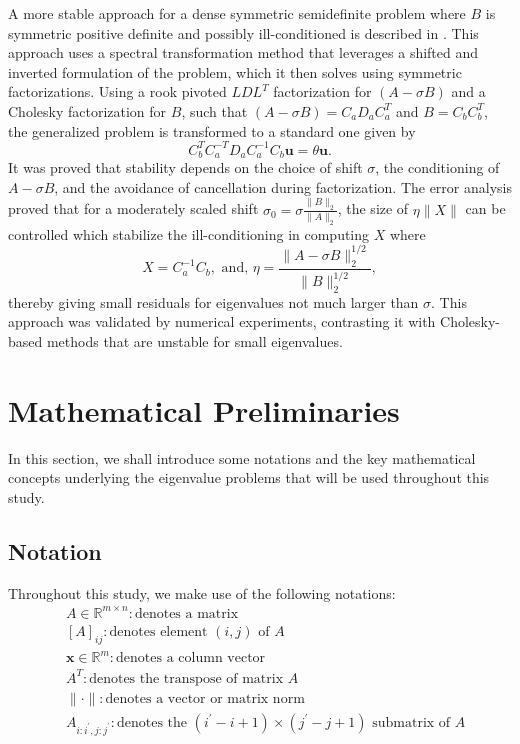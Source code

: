 A more stable approach for a dense symmetric semidefinite problem where $B$ is symmetric positive definite and possibly ill-conditioned is described in \cite{stewart2024spectraltransformationdensesymmetric}. This approach uses a spectral transformation method that leverages a shifted and inverted formulation of the problem, which it then solves using symmetric factorizations. Using a rook pivoted $LDL^T$ factorization for $(A-\sigma B)$ and a Cholesky factorization for $B$, such that $(A-\sigma B) = C_aD_aC_a^T$ and $B = C_bC_b^T$, the generalized problem is transformed to a standard one given by
\begin{equation}\label{eq:SpectralTrans_With_LDL}
	C_b^TC_a^{-T}D_aC_a^{-1}C_b \mathbf{u} = \theta \mathbf{u}.
\end{equation}
It was proved that stability depends on the choice of shift $\sigma$, the conditioning of $A - \sigma B$, and the avoidance of cancellation during factorization. The error analysis proved that for a moderately scaled shift $\sigma_0 = \sigma \frac{\|B\|_2}{\|A\|_2}$, the size of $\eta \|X\|$ can be controlled which stabilize the ill-conditioning in computing $X$ where 
\begin{equation}\label{eq:ConditioningMetricsFromStewart}
	X = C_a^{-1}C_b, \text{ and, } \eta = \frac{\|A - \sigma B\|_2^{1/2}}{\|B\|_2^{1/2}},
\end{equation}
thereby giving small residuals for eigenvalues not much larger than $\sigma$. This approach was validated by numerical experiments, contrasting it with  Cholesky-based methods that are unstable for small eigenvalues.

\section{Mathematical Preliminaries}\label{sec:MathPrelim}
In this section, we shall introduce some notations and the key mathematical concepts underlying the eigenvalue problems that will be used throughout this study.
\subsection{Notation}\label{sec:Notation}
Throughout this study, we make use of the following notations:
\begin{align*}\nonumber
	&A \in \mathbb{R}^{m\times n}: \text{denotes a matrix}\\
	&[A]_{ij}: \text{denotes element $(i, j)$ of $A$}\\
	&\mathbf{x} \in \mathbb{R}^{m}: \text{denotes a column vector}\\
	&A^{T}: \text{denotes the transpose of matrix $A$}\\
	&\| \cdot \|: \text{denotes a vector or matrix norm }\\
	&A_{i:i^\prime, j:j^\prime}: \text{denotes the $(i^\prime - i + 1) \times (j^\prime - j + 1)$ submatrix of $A$}
\end{align*}

